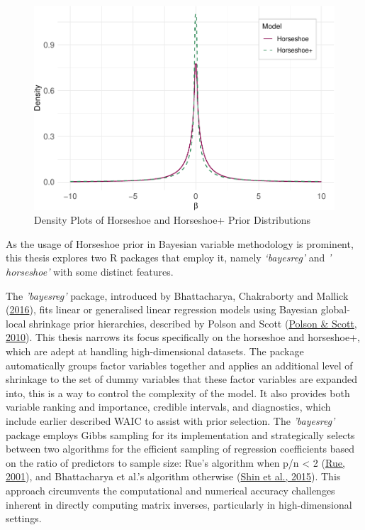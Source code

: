 \documentclass[
  11pt,
]{article}
\begin{document}
\begin{figure}

{\centering \includegraphics[width=0.75\linewidth]{dissertation_files/figure-latex/Horseshoe Plus Priors-1} 

}

\caption{Density Plots of Horseshoe and Horseshoe+ Prior Distributions}\label{fig:Horseshoe Plus Priors}
\end{figure}

As the usage of Horseshoe prior in Bayesian variable methodology is
prominent, this thesis explores two R packages that employ it, namely
\emph{`bayesreg'} and \emph{' horseshoe'} with some distinct features.

\hfill\break

The \emph{'bayesreg'} package, introduced by Bhattacharya, Chakraborty
and Mallick (\protect\hyperlink{ref-Bhattacharya2016}{2016}), fits
linear or generalised linear regression models using Bayesian
global-local shrinkage prior hierarchies, described by Polson and Scott
(\protect\hyperlink{ref-Polson2010}{Polson \& Scott, 2010}). This thesis
narrows its focus specifically on the horseshoe and horseshoe+, which
are adept at handling high-dimensional datasets. The package
automatically groups factor variables together and applies an additional
level of shrinkage to the set of dummy variables that these factor
variables are expanded into, this is a way to control the complexity of
the model. It also provides both variable ranking and importance,
credible intervals, and diagnostics, which include earlier described
WAIC to assist with prior selection. The \emph{'bayesreg'} package
employs Gibbs sampling for its implementation and strategically selects
between two algorithms for the efficient sampling of regression
coefficients based on the ratio of predictors to sample size: Rue's
algorithm when p/n \textless{} 2 (\protect\hyperlink{ref-Rue2001}{Rue,
2001}), and Bhattacharya et al.'s algorithm otherwise
(\protect\hyperlink{ref-Shin2015}{Shin et al., 2015}). This approach
circumvents the computational and numerical accuracy challenges inherent
in directly computing matrix inverses, particularly in high-dimensional
settings.
\end{document}
